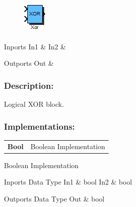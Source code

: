 \label{block:Xor}
\begin{figure}[H]\includegraphics{Xor}\end{figure} 

\begin{XtoCtabular}{Inports}
In1 & \tabularnewline
\hline
In2 & \tabularnewline
\hline
\end{XtoCtabular}


\begin{XtoCtabular}{Outports}
Out & \tabularnewline
\hline
\end{XtoCtabular}

\subsubsection*{Description:}
Logical XOR block.

\subsubsection*{Implementations:}
\begin{tabular}{l l}
\textbf{Bool} & Boolean Implementation\tabularnewline
\end{tabular}

\nopagebreak[0]

Boolean Implementation

\begin{XtoCtabular}{Inports Data Type}
In1 & bool\tabularnewline
\hline
In2 & bool\tabularnewline
\hline
\end{XtoCtabular}

\begin{XtoCtabular}{Outports Data Type}
Out & bool\tabularnewline
\hline
\end{XtoCtabular}

\ifdefined \AddTestReports
{}
\fi
